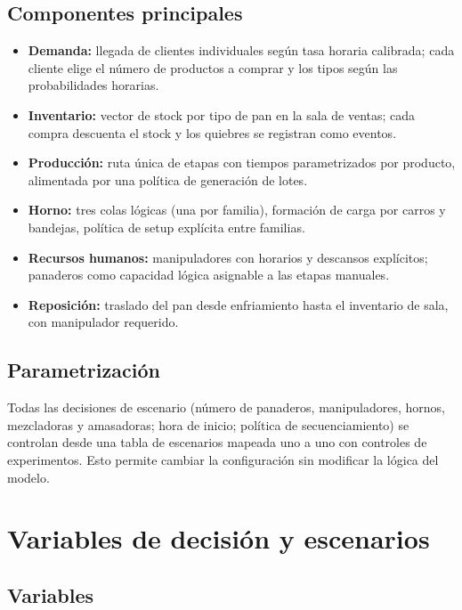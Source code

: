 \documentclass[12pt]{article}
\begin{document}
\subsection{Componentes principales}

\begin{itemize}
  \item \textbf{Demanda:} llegada de clientes individuales según tasa horaria calibrada; cada cliente elige el número de productos a comprar y los tipos según las probabilidades horarias.
  \item \textbf{Inventario:} vector de stock por tipo de pan en la sala de ventas; cada compra descuenta el stock y los quiebres se registran como eventos.
  \item \textbf{Producción:} ruta única de etapas con tiempos parametrizados por producto, alimentada por una política de generación de lotes.
  \item \textbf{Horno:} tres colas lógicas (una por familia), formación de carga por carros y bandejas, política de setup explícita entre familias.
  \item \textbf{Recursos humanos:} manipuladores con horarios y descansos explícitos; panaderos como capacidad lógica asignable a las etapas manuales.
  \item \textbf{Reposición:} traslado del pan desde enfriamiento hasta el inventario de sala, con manipulador requerido.
\end{itemize}

\subsection{Parametrización}

Todas las decisiones de escenario (número de panaderos, manipuladores, hornos, mezcladoras y amasadoras; hora de inicio; política de secuenciamiento) se controlan desde una tabla de escenarios mapeada uno a uno con controles de experimentos. Esto permite cambiar la configuración sin modificar la lógica del modelo.

\newpage
\section{Variables de decisión y escenarios}

\subsection{Variables}
\end{document}
